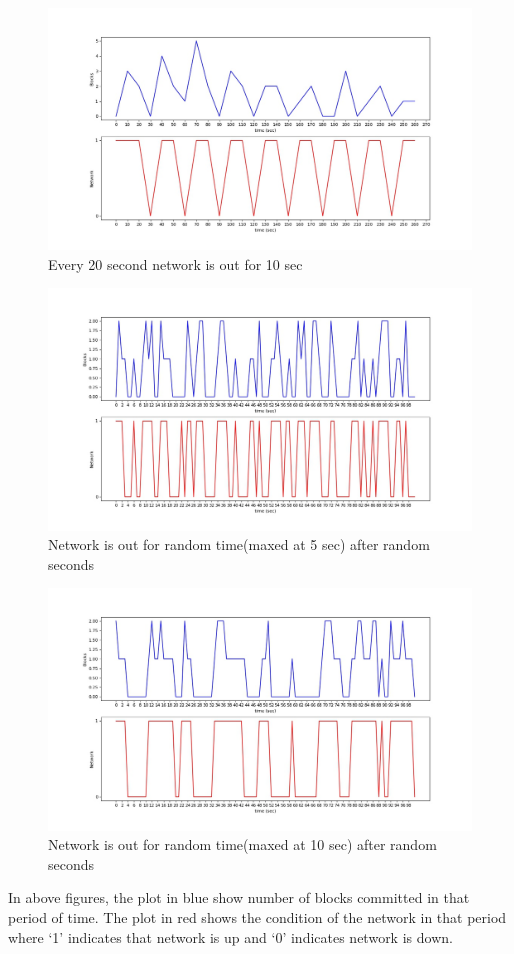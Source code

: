 \begin{figure}[!h]
    \centering
    \includegraphics[width=1\textwidth]{images/10_20.jpg}
    \caption{Every 20 second network is out for 10 sec}
    \label{fig:10_20}
\end{figure}
\begin{figure}[!h]
    \centering
    \includegraphics[width=1\textwidth]{images/5_random.jpg}
    \caption{Network is out for random time(maxed at 5 sec) after random seconds}
    \label{fig:5_random}
\end{figure}
\begin{figure}[!h]
    \centering
    \includegraphics[width=1\textwidth]{images/10_random.jpg}
    \caption{Network is out for random time(maxed at 10 sec) after random seconds}
    \label{fig:10_random}
\end{figure}
\clearpage
In above figures, the plot in blue show number of blocks committed in that period of time. The plot in red shows the condition of the network in that period where `1' indicates that network is up and `0' indicates network is down.

